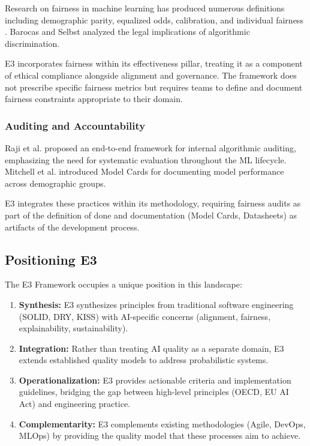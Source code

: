 Research on fairness in machine learning has produced numerous definitions including demographic parity, equalized odds, calibration, and individual fairness \cite{mehrabi2021survey}. Barocas and Selbst \cite{barocas2016big} analyzed the legal implications of algorithmic discrimination.

E3 incorporates fairness within its effectiveness pillar, treating it as a component of ethical compliance alongside alignment and governance. The framework does not prescribe specific fairness metrics but requires teams to define and document fairness constraints appropriate to their domain.

\subsubsection{Auditing and Accountability}

Raji et al. \cite{raji2020closing} proposed an end-to-end framework for internal algorithmic auditing, emphasizing the need for systematic evaluation throughout the ML lifecycle. Mitchell et al. \cite{mitchell2019model} introduced Model Cards for documenting model performance across demographic groups.

E3 integrates these practices within its methodology, requiring fairness audits as part of the definition of done and documentation (Model Cards, Datasheets) as artifacts of the development process.

\subsection{Positioning E3}

The E3 Framework occupies a unique position in this landscape:

\begin{enumerate}[leftmargin=2em]
    \item \textbf{Synthesis:} E3 synthesizes principles from traditional software engineering (SOLID, DRY, KISS) with AI-specific concerns (alignment, fairness, explainability, sustainability).
    
    \item \textbf{Integration:} Rather than treating AI quality as a separate domain, E3 extends established quality models to address probabilistic systems.
    
    \item \textbf{Operationalization:} E3 provides actionable criteria and implementation guidelines, bridging the gap between high-level principles (OECD, EU AI Act) and engineering practice.
    
    \item \textbf{Complementarity:} E3 complements existing methodologies (Agile, DevOps, MLOps) by providing the quality model that these processes aim to achieve.
\end{enumerate}

